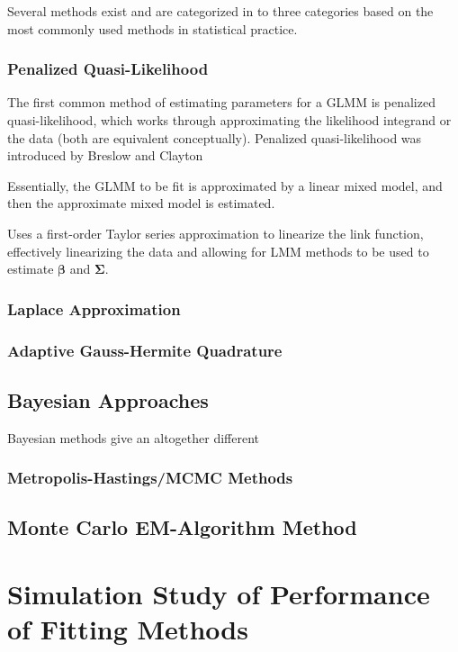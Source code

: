 \documentclass{article}\usepackage[]{graphicx}\usepackage[]{color}
\newcommand{\mb}[1]{$\bm{#1}$}
\begin{document}
Several methods exist and are categorized in to three categories based on the most commonly used methods in statistical practice. 

\subsubsection{Penalized Quasi-Likelihood}

The first common method of estimating parameters for a GLMM is penalized quasi-likelihood, which works through approximating the likelihood integrand or the data (both are equivalent conceptually). Penalized quasi-likelihood was introduced by Breslow and Clayton 

Essentially, the GLMM to be fit is approximated by a linear mixed model, and then the approximate mixed model is estimated.

Uses a first-order Taylor series approximation to linearize the link function, effectively linearizing the data and allowing for LMM methods to be used to estimate \mb{\beta} and \mb{\Sigma}. 

\subsubsection{Laplace Approximation}



\subsubsection{Adaptive Gauss-Hermite Quadrature}



\subsection{Bayesian Approaches}

Bayesian methods give an altogether different 

\subsubsection{Metropolis-Hastings/MCMC Methods}



\subsection{Monte Carlo EM-Algorithm Method}



\section{Simulation Study of Performance of Fitting Methods}
\end{document}
